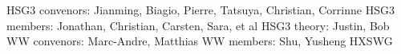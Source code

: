 
HSG3 convenors: Jianming, Biagio, Pierre, Tatsuya, Christian, Corrinne
HSG3 members: Jonathan, Christian, Carsten, Sara, et al
HSG3 theory: Justin, Bob
WW convenors: Marc-Andre, Matthias
WW members: Shu, Yusheng
HXSWG
